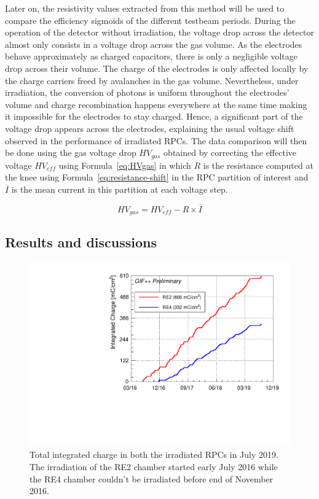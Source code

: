 	Later on, the resistivity values extracted from this method will be used to compare the efficiency sigmoids of the different testbeam periods. During the operation of the detector without irradiation, the voltage drop across the detector almost only consists in a voltage drop across the gas volume. As the electrodes behave approximately as charged capacitors, there is only a negligible voltage drop across their volume. The charge of the electrodes is only affected locally by the charge carriers freed by avalanches in the gas volume. Nevertheless, under irradiation, the conversion of photons is uniform throughout the electrodes' volume and charge recombination happens everywhere at the same time making it impossible for the electrodes to stay charged. Hence, a significant part of the voltage drop appears across the electrodes, explaining the usual voltage shift observed in the performance of irradiated RPCs. The data comparison will then be done using the gas voltage drop $HV_{gas}$ obtained by correcting the effective voltage $HV_{eff}$ using Formula~\ref{eq:HVgas} in which $R$ is the resistance computed at the knee using Formula~\ref{eq:resistance-shift} in the RPC partition of interest and $\overline{I}$ is the mean current in this partition at each voltage step.
	
	\begin{equation}
	\label{eq:HVgas}
		HV_{gas} = HV_{eff} - R\times\overline{I}
	\end{equation}
	
	\subsection{Results and discussions}
	\label{chapt5:ssec:resultsGIFpp}
	
\begingroup\setlength{\intextsep}{0pt}\setlength{\columnsep}{15pt}
	
	\begin{figure}
        \centering
		\includegraphics[width = \linewidth]{fig/chapt5/GIFpp-Qint.pdf}
		\caption{\label{fig:GIFppQint} Total integrated charge in both the irradiated RPCs in July 2019. The irradiation of the RE2 chamber started early July 2016 while the RE4 chamber couldn't be irradiated before end of November 2016.}
	\end{figure}
    
